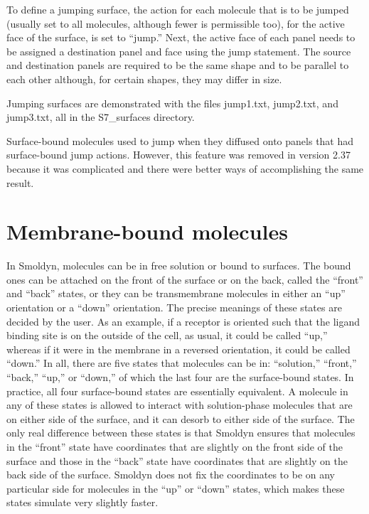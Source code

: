 \documentclass {book}
\begin{document}
To define a jumping surface, the action for each molecule that is to be jumped (usually set to all molecules, although fewer is permissible too), for the active face of the surface, is set to ``jump.'' Next, the active face of each panel needs to be assigned a destination panel and face using the jump statement. The source and destination panels are required to be the same shape and to be parallel to each other although, for certain shapes, they may differ in size.

Jumping surfaces are demonstrated with the files jump1.txt, jump2.txt, and jump3.txt, all in the S7\_surfaces directory.

Surface-bound molecules used to jump when they diffused onto panels that had surface-bound jump actions. However, this feature was removed in version 2.37 because it was complicated and there were better ways of accomplishing the same result.

\section{Membrane-bound molecules}

In Smoldyn, molecules can be in free solution or bound to surfaces. The bound ones can be attached on the front of the surface or on the back, called the ``front'' and ``back'' states, or they can be transmembrane molecules in either an ``up'' orientation or a ``down'' orientation. The precise meanings of these states are decided by the user. As an example, if a receptor is oriented such that the ligand binding site is on the outside of the cell, as usual, it could be called ``up,'' whereas if it were in the membrane in a reversed orientation, it could be called ``down.'' In all, there are five states that molecules can be in: ``solution,'' ``front,'' ``back,'' ``up,'' or ``down,'' of which the last four are the surface-bound states. In practice, all four surface-bound states are essentially equivalent. A molecule in any of these states is allowed to interact with solution-phase molecules that are on either side of the surface, and it can desorb to either side of the surface. The only real difference between these states is that Smoldyn ensures that molecules in the ``front'' state have coordinates that are slightly on the front side of the surface and those in the ``back'' state have coordinates that are slightly on the back side of the surface. Smoldyn does not fix the coordinates to be on any particular side for molecules in the ``up'' or ``down'' states, which makes these states simulate very slightly faster.
\end{document}
